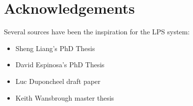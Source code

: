 \chapter{Acknowledgements}

Several sources have been the inspiration for the LPS system:
\begin{itemize}
\item Sheng Liang's PhD Thesis \cite{Liang98}
\item David Espinosa's PhD Thesis \cite{Espinosa95} 
\item Luc Duponcheel draft paper \cite{Duponcheel95}
\item Keith Wansbrough master thesis \cite{Wansbrough97}
\end{itemize}
